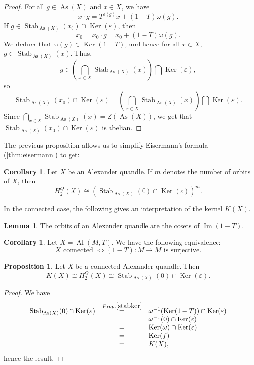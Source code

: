 \documentclass[a4paper,11pt]{amsart}
\theoremstyle{definition}
\newtheorem{lem}[thm]{Lemma}
\newtheorem{prop}[thm]{Proposition}
\newtheorem{cor}[thm]{Corollary}
\DeclareMathOperator{\im}{Im}
\DeclareMathOperator{\Ker}{Ker}
\DeclareMathOperator{\Stab}{Stab}
\DeclareMathOperator{\Al}{Al}
\DeclareMathOperator{\As}{As}
\begin{document}
\begin{proof}
For all $g\in \As(X)$ and $x\in X$, we have
$$x \cdot g = T^{\varepsilon(g)} x + (1-T) \omega(g).$$
If $g\in \Stab_{\As(X)}(x_0)\cap \Ker(\varepsilon)$, then
$$ x_0 = x_0\cdot g = x_0 +(1-T) \omega(g).$$
We deduce that $\omega(g)\in \Ker(1-T)$, and hence for all $x\in X$, $g\in \Stab_{\As(X)}(x)$.
Thus, $$g\in \left(\bigcap\limits_{x\in X} \Stab_{\As(X)}(x)\right)\bigcap \Ker(\varepsilon),$$
so
$$\Stab_{\As(X)}(x_0)\cap \Ker(\varepsilon) = \left( \bigcap \limits_{x\in X} \Stab_{\As(X)}(x) \right)\bigcap\Ker(\varepsilon).$$
Since $\bigcap\limits_{x\in X} \Stab_{\As(X)}(x) =Z(\As(X))$, we get that $\Stab_{\As(X)}(x_0)\cap \Ker(\varepsilon)$ is abelian.
\end{proof}

The previous proposition allows us to simplify Eisermann's formula (\ref{thm:eisermann}) to get:
\begin{cor}
Let $X$ be an Alexander quandle.
If $m$ denotes the number of orbits of $X$, then
\[
H_2^Q(X) \cong \left(\Stab_{\As(X)}(0)\cap \Ker(\varepsilon) \right)^m.
\]
\end{cor}

In the connected case, the following gives an interpretation of the kernel $K(X)$.

\begin{lem}
The orbits of an Alexander quandle are the cosets of $\im(1-T)$.
\end{lem}

\begin{cor}
Let $X=\Al(M,T)$.
We have the following equivalence:
\[
X \text{ connected } \iff (1-T):M \to M \text{ is surjective.}
\]
\end{cor}

\begin{prop}
Let $X$ be a connected Alexander quandle. Then
\[
K(X) \cong H_2^Q(X) \cong \Stab_{\As(X)}(0)\cap \Ker(\varepsilon).
\]
\end{prop}
\begin{proof}
We have
\[\begin{array}{ccl}
\Stab_{\As(X)}(0)\cap \Ker(\varepsilon) & \overset{Prop. \ref{stabker}}{=} &\omega^{-1}( \Ker(1-T))\cap \Ker(\varepsilon)\\
&= & \omega^{-1}(0)\cap \Ker(\varepsilon)\\
&=& \Ker(\omega)\cap \Ker(\varepsilon) \\
&= &\Ker(f) \\
& = & K(X),
\end{array}\]
hence the result.
\end{proof}
\end{document}
